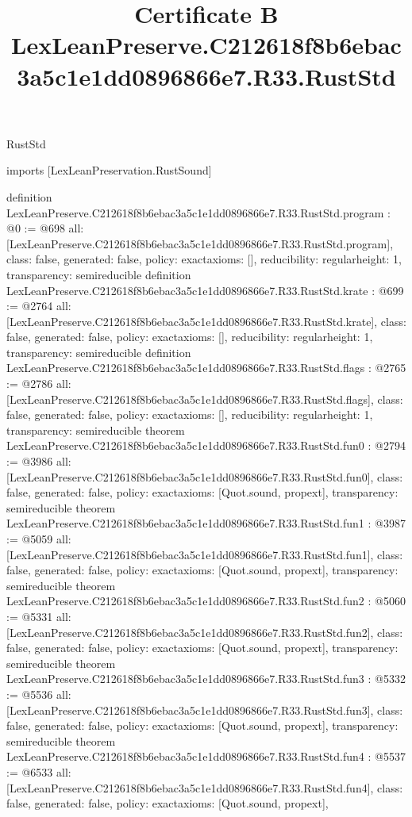 \begin{lexlean}{RustStd}
\title{Certificate B LexLeanPreserve.C212618f8b6ebac3a5c1e1dd0896866e7.R33.RustStd}
\begin{coremodule}
imports [LexLeanPreservation.RustSound]

definition LexLeanPreserve.C212618f8b6ebac3a5c1e1dd0896866e7.R33.RustStd.program : @0 := @698 {
  all: [LexLeanPreserve.C212618f8b6ebac3a5c1e1dd0896866e7.R33.RustStd.program],
  class: false,
  generated: false,
  policy: exact{axioms: []},
  reducibility: regular{height: 1},
  transparency: semireducible
}
definition LexLeanPreserve.C212618f8b6ebac3a5c1e1dd0896866e7.R33.RustStd.krate : @699 := @2764 {
  all: [LexLeanPreserve.C212618f8b6ebac3a5c1e1dd0896866e7.R33.RustStd.krate],
  class: false,
  generated: false,
  policy: exact{axioms: []},
  reducibility: regular{height: 1},
  transparency: semireducible
}
definition LexLeanPreserve.C212618f8b6ebac3a5c1e1dd0896866e7.R33.RustStd.flags : @2765 := @2786 {
  all: [LexLeanPreserve.C212618f8b6ebac3a5c1e1dd0896866e7.R33.RustStd.flags],
  class: false,
  generated: false,
  policy: exact{axioms: []},
  reducibility: regular{height: 1},
  transparency: semireducible
}
theorem LexLeanPreserve.C212618f8b6ebac3a5c1e1dd0896866e7.R33.RustStd.fun0 : @2794 := @3986 {
  all: [LexLeanPreserve.C212618f8b6ebac3a5c1e1dd0896866e7.R33.RustStd.fun0],
  class: false,
  generated: false,
  policy: exact{axioms: [Quot.sound, propext]},
  transparency: semireducible
}
theorem LexLeanPreserve.C212618f8b6ebac3a5c1e1dd0896866e7.R33.RustStd.fun1 : @3987 := @5059 {
  all: [LexLeanPreserve.C212618f8b6ebac3a5c1e1dd0896866e7.R33.RustStd.fun1],
  class: false,
  generated: false,
  policy: exact{axioms: [Quot.sound, propext]},
  transparency: semireducible
}
theorem LexLeanPreserve.C212618f8b6ebac3a5c1e1dd0896866e7.R33.RustStd.fun2 : @5060 := @5331 {
  all: [LexLeanPreserve.C212618f8b6ebac3a5c1e1dd0896866e7.R33.RustStd.fun2],
  class: false,
  generated: false,
  policy: exact{axioms: [Quot.sound, propext]},
  transparency: semireducible
}
theorem LexLeanPreserve.C212618f8b6ebac3a5c1e1dd0896866e7.R33.RustStd.fun3 : @5332 := @5536 {
  all: [LexLeanPreserve.C212618f8b6ebac3a5c1e1dd0896866e7.R33.RustStd.fun3],
  class: false,
  generated: false,
  policy: exact{axioms: [Quot.sound, propext]},
  transparency: semireducible
}
theorem LexLeanPreserve.C212618f8b6ebac3a5c1e1dd0896866e7.R33.RustStd.fun4 : @5537 := @6533 {
  all: [LexLeanPreserve.C212618f8b6ebac3a5c1e1dd0896866e7.R33.RustStd.fun4],
  class: false,
  generated: false,
  policy: exact{axioms: [Quot.sound, propext]},
}
\end{coremodule}
\end{lexlean}
